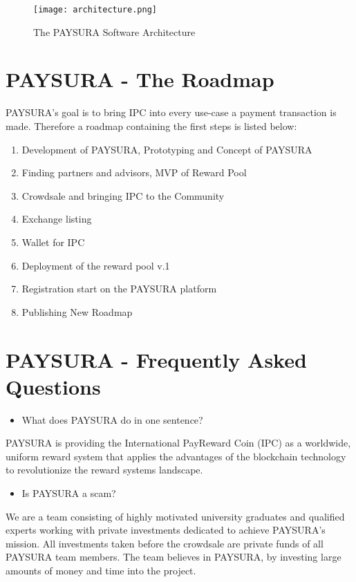 \documentclass[twoside,onecolumn]{article}
\begin{document}
\begin{figure}[ht]
\centering
\texttt{[image: architecture.png]}
\caption{The PAYSURA Software Architecture}
\label{fig2}
\end{figure}



\section{PAYSURA - The Roadmap}
PAYSURA's goal is to bring IPC into every use-case a payment transaction is made. Therefore a roadmap containing the first steps is listed below:
\begin{enumerate}

\item	Development of PAYSURA, Prototyping and Concept of PAYSURA
\item	Finding partners and advisors, MVP of Reward Pool
\item	Crowdsale and bringing IPC to the Community
\item	Exchange listing
\item	Wallet for IPC 
\item	Deployment of the reward pool v.1
\item	Registration start on the PAYSURA platform
\item	Publishing New Roadmap

\end{enumerate}
\newpage

\section{PAYSURA - Frequently Asked Questions}

\begin{itemize}
\item What does PAYSURA do in one sentence?
\end{itemize}

PAYSURA is providing the International PayReward Coin (IPC) as a worldwide, uniform reward system that applies the advantages of the blockchain technology to revolutionize the reward systems landscape. 

\begin{itemize}
\item Is PAYSURA a scam?
\end{itemize} 
We are a team consisting of highly motivated university graduates and qualified experts working with private investments dedicated to achieve PAYSURA's mission. All investments taken before the crowdsale are private funds of all PAYSURA team members. The team believes in PAYSURA, by investing large amounts of money and time into the project.
\end{document}
